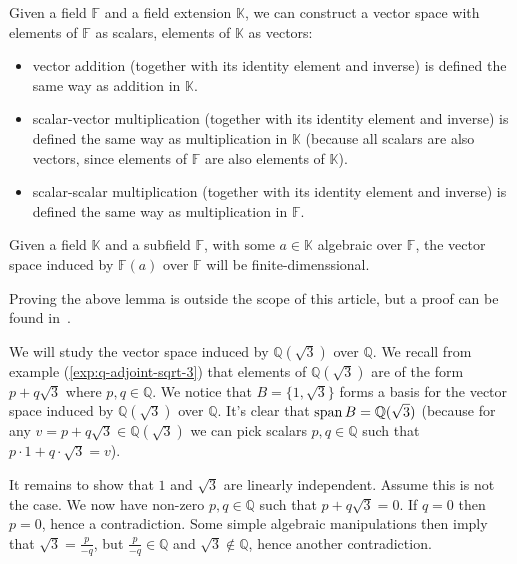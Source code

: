\begin{lemma}\label{lem:field-extension-vector-space}
  Given a field $\mathbb{F}$ and a field extension $\mathbb{K}$, we can construct a vector space with elements of $\mathbb{F}$ as scalars, elements of $\mathbb{K}$ as vectors:
  \begin{itemize}
    \item vector addition (together with its identity element and inverse) is defined the same way as addition in $\mathbb{K}$. 
    \item scalar-vector multiplication (together with its identity element and inverse) is defined the same way as multiplication in $\mathbb{K}$ (because all scalars are also vectors, since elements of $\mathbb{F}$ are also elements of $\mathbb{K}$).
    \item scalar-scalar multiplication (together with its identity element and inverse) is defined the same way as multiplication in $\mathbb{F}$.
  \end{itemize}
\end{lemma}

\begin{lemma}\label{lem:algebraic-field-finite-vector-space}
   Given a field $\mathbb{K}$ and a subfield $\mathbb{F}$, with some $a \in \mathbb{K}$ algebraic over $\mathbb{F}$, the vector space induced by $\mathbb{F}(a) $ over $\mathbb{F}$ will be finite-dimenssional.
\end{lemma}

Proving the above lemma is outside the scope of this article, but a proof can be found in~\cite{milne2022}.

\begin{exmp}
  We will study the vector space induced by $\mathbb{Q} (\sqrt 3)$ over $\mathbb{Q}$. We recall from example (\ref{exp:q-adjoint-sqrt-3}) that elements of $\mathbb{Q} (\sqrt 3)$ are of the form $p + q \sqrt 3$ where $p, q \in \mathbb{Q}$. We notice that $B = \{1, \sqrt 3\}$ forms a basis for the vector space induced by $\mathbb{Q} (\sqrt 3)$ over $\mathbb{Q} $. It's clear that $\operatorname{span} B = \mathbb{Q} (\sqrt 3)$ (because for any $v = p + q \sqrt 3 \in \mathbb{Q} (\sqrt 3)$ we can pick scalars $p, q \in \mathbb{Q} $ such that $p \cdot 1 + q \cdot \sqrt 3 = v$). 

  It remains to show that $1$ and $\sqrt 3$ are linearly independent. Assume this is not the case. We now have non-zero $p, q \in \mathbb{Q} $ such that $p + q \sqrt 3 = 0$. If $q = 0$ then $p = 0$, hence a contradiction. Some simple algebraic manipulations then imply that $\sqrt 3  = \frac p {-q}$, but $\frac p {-q} \in \mathbb{Q} $ and $\sqrt 3 \not\in \mathbb{Q} $, hence another contradiction.
\end{exmp}
